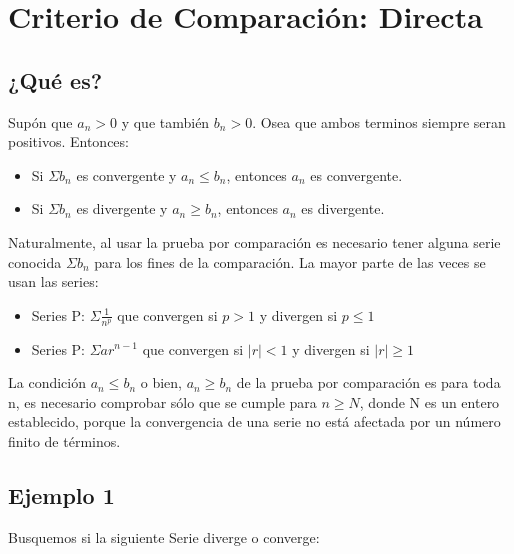 \documentclass[12pt]{report}							    %
\begin{document}
    \clearpage
    \section{Criterio de Comparación: Directa}


    \subsection{¿Qué es?}
    Supón que $a _n > 0$ y que también $b_n > 0$. Osea que ambos terminos siempre seran positivos.
    Entonces:

    \begin{itemize}
        \item Si $\Sigma b_n$ es convergente y $a_n \leq b_n$, entonces $a_n$ es convergente. 
        \item Si $\Sigma b_n$ es divergente y $a_n \geq b_n$, entonces $a_n$ es divergente. 
    \end{itemize}

    Naturalmente, al usar la prueba por comparación es necesario tener alguna serie conocida $\Sigma b_n$ para los fines de la comparación. La mayor parte de las veces se usan las series:

    \begin{itemize}
        \item Series P: $\Sigma \frac{1}{n^p}$ que convergen si $p>1$ y divergen si $p\leq 1$
        \item Series P: $\Sigma ar^{n-1}$ que convergen si $|r|<1$ y divergen si $|r|\geq 1$
    \end{itemize}

    La condición $a_n \leq b_n$ o bien, $a_n \geq b_n$ de la prueba por comparación es para toda n, es necesario comprobar sólo que se cumple para $n \geq N$, donde N es un entero establecido, porque la convergencia de una serie no está afectada por un número finito de términos.
    \subsection{Ejemplo 1}
    Busquemos si la siguiente Serie diverge o converge:
\end{document}
